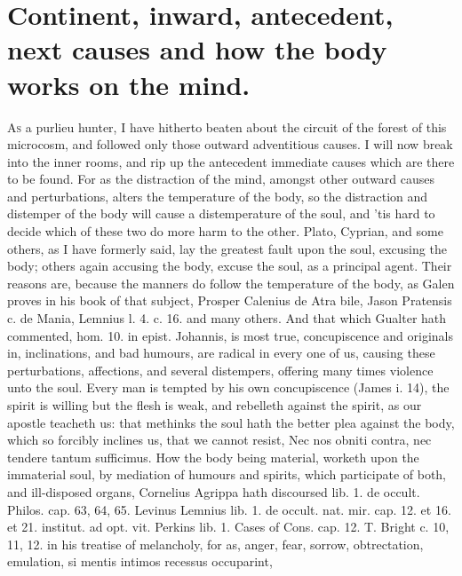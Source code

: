 {%

\section{Continent, inward, antecedent, next causes and how the body works on the mind.}

\lettrine{A}{s} a purlieu hunter, I have hitherto beaten about the circuit of the
forest of this microcosm, and followed only those outward adventitious
causes. I will now break into the inner rooms, and rip up the
antecedent immediate causes which are there to be found. For as the
distraction of the mind, amongst other outward causes and
perturbations, alters the temperature of the body, so the distraction
and distemper of the body will cause a distemperature of the soul, and
'tis hard to decide which of these two do more harm to the other.
Plato, Cyprian, and some others, as I have formerly said, lay the
greatest fault upon the soul, excusing the body; others again accusing
the body, excuse the soul, as a principal agent. Their reasons are,
because the manners do follow the temperature of the body, as
Galen proves in his book of that subject, Prosper Calenius de Atra
bile, Jason Pratensis c. de Mania, Lemnius l. 4. c. 16. and many
others. And that which Gualter hath commented, hom. 10. in epist.
Johannis, is most true, concupiscence and originals in, inclinations,
and bad humours, are radical in every one of us, causing these
perturbations, affections, and several distempers, offering many times
violence unto the soul. Every man is tempted by his own concupiscence
(James i. 14), the spirit is willing but the flesh is weak, and
rebelleth against the spirit, as our apostle teacheth us: that
methinks the soul hath the better plea against the body, which so
forcibly inclines us, that we cannot resist, Nec nos obniti contra, nec
tendere tantum sufficimus. How the body being material, worketh upon
the immaterial soul, by mediation of humours and spirits, which
participate of both, and ill-disposed organs, Cornelius Agrippa hath
discoursed lib. 1. de occult. Philos. cap. 63, 64, 65. Levinus Lemnius
lib. 1. de occult. nat. mir. cap. 12. et 16. et 21. institut. ad opt.
vit. Perkins lib. 1. Cases of Cons. cap. 12. T. Bright c. 10, 11, 12.
in his treatise of melancholy, for as,  anger, fear, sorrow,
obtrectation, emulation, \etc{} si mentis intimos recessus occuparint,
}
